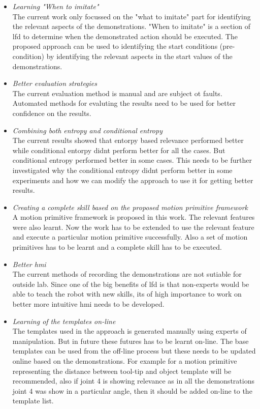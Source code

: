 \begin{itemize}
    \item \textit{Learning "When to imitate" } \\
        The current work only focussed on the "what to imitate" part for identifying
the relevant aspects of the demonstrations. "When to imitate" is a section of 
\acrshort{lfd} to determine when the demonstrated action should be executed.
The proposed approach can be used to identifying the start conditions (pre-condition)
by identifying the relevant aspects in the start values of the demonstrations.

    \item \textit{Better evaluation strategies} \\
        The current evaluation method is manual and are subject ot faults. Automated
methods for evaluting the results need to be used for better confidence on the results.

    \item \textit{Combining both entropy and conditional entropy } \\
The current results showed that entorpy based relevance performed better while
conditional entorpy didnt perform better for all the cases. But conditional entropy 
performed better  in some cases. This needs to be further investigated why the 
conditional entropy didnt perform better in some experiments and how we can modify 
the approach to use it for getting better results.

    \item \textit{Creating a complete skill based on the proposed motion primitive framework}\\
A motion primitive framework is proposed in this work. The relevant features were also 
learnt. Now the work has to be extended to use the relevant feature and execute a particular
motion primitive successfully. Also a set of motion primitives has to be learnt and 
a complete skill has to be executed.

    \item \textit{Better \acrfull{hmi}} \\
The current methods of recording the demonstrations are not sutiable for outside lab.
Since one of the big benefits of \acrshort{lfd} is that non-experts would be able to 
teach the robot with new skills, its of high importance to work on better more intuitive 
\acrshort{hmi} needs to be developed.

    \item \textit{Learning of the templates on-line} \\
The templates used in the approach is generated manually using experts of manipulation.
But in future these futures has to be learnt on-line. The base templates can be used 
from the off-line process but these needs to be updated online based on the demonstrations.
For example for a motion primitive representing the distance between tool-tip and object template will 
be recommended, also if joint 4 is showing relevance as in all the demonstrations joint 4 
was show in a particular angle, then it should be added on-line to the 
template list.


\end{itemize}
